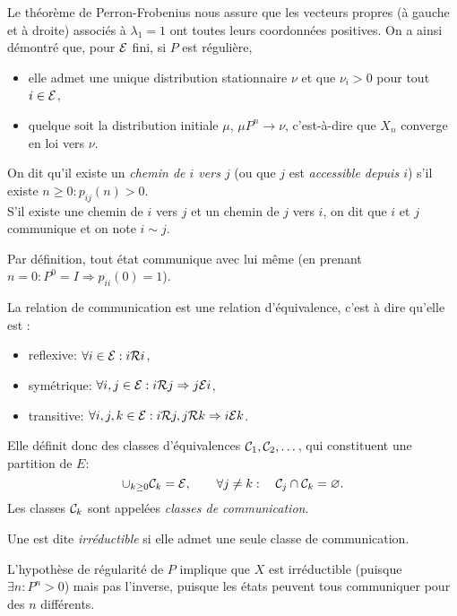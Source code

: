 \remark
Le théorème de Perron-Frobenius nous assure que les vecteurs propres (à gauche et à droite) associés à $\lambda_1 = 1$ ont toutes leurs coordonnées positives. On a ainsi démontré que, pour $\mathcal{E}$ fini, si $P$ est régulière, 
\begin{itemize}
  \item elle admet une unique distribution stationnaire $\nu$ et que $\nu_i > 0$ pour tout $i \in \mathcal{E}$, 
  \item quelque soit la distribution initiale $\mu$, $\mu P^n \to \nu$, c'est-à-dire que $X_n$ converge en loi vers $\nu$.
\end{itemize}

\begin{definition}
  On dit qu'il existe un {\em chemin de $i$ vers $j$} (ou que $j$ est {\em accessible depuis $i$}) s'il existe $n \geq 0: p_{ij}(n) > 0$. \\
  S'il existe une chemin de $i$ vers $j$ et un chemin de $j$ vers $i$, on dit que $i$ et $j$ communique et on note $i \sim j$.
\end{definition}

\remark
Par définition, tout état communique avec lui même (en prenant $n= 0 : P^0 = I \Rightarrow p_{ii}(0) = 1$).

La relation de communication est une relation d'équivalence, c'est à dire qu'elle est :
\begin{itemize}
  \item reflexive: $\forall i \in \mathcal{E}: i \mathcal{R} i$,
  \item symétrique: $\forall i, j \in \mathcal{E}: i \mathcal{R} j \Rightarrow j \mathcal{E} i$,
  \item transitive: $\forall i, j, k \in \mathcal{E}: i \mathcal{R} j, j \mathcal{R} k \Rightarrow i \mathcal{E} k$.
\end{itemize}
Elle définit donc des classes d'équivalences $\mathcal{C}_1, \mathcal{C}_2, \dots $, qui constituent une partition de $E$:
$$
\cup_{k \geq 0} \mathcal{C}_k = \mathcal{E}, \qquad \forall j \neq k: \quad \mathcal{C}_j \cap \mathcal{C}_k = \varnothing.
$$
Les classes $\mathcal{C}_k$ sont appelées {\em classes de communication}.

\begin{definition}
  Une \cM est dite {\em irréductible} si elle admet une seule classe de communication.
\end{definition}

\remark
L'hypothèse de régularité de $P$ implique que $X$ est irréductible (puisque $\exists n: P^n > 0$) mais pas l'inverse, puisque les états peuvent tous communiquer pour des $n$ différents.


